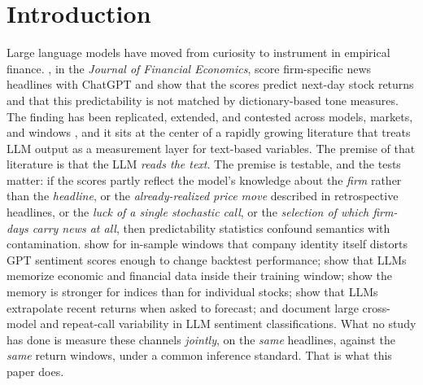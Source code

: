 \section{Introduction}\label{sec:intro}

Large language models have moved from curiosity to instrument in empirical finance. \citet{lopezlira2026}, in the \emph{Journal of Financial Economics}, score firm-specific news headlines with ChatGPT and show that the scores predict next-day stock returns and that this predictability is not matched by dictionary-based tone measures. The finding has been replicated, extended, and contested across models, markets, and windows \citep{nie2024survey}, and it sits at the center of a rapidly growing literature that treats LLM output as a measurement layer for text-based variables. The premise of that literature is that the LLM \emph{reads the text}. The premise is testable, and the tests matter: if the scores partly reflect the model's knowledge about the \emph{firm} rather than the \emph{headline}, or the \emph{already-realized price move} described in retrospective headlines, or the \emph{luck of a single stochastic call}, or the \emph{selection of which firm-days carry news at all}, then predictability statistics confound semantics with contamination. \citet{glasserman2023} show for in-sample windows that company identity itself distorts GPT sentiment scores enough to change backtest performance; \citet{lopezlira2025} show that LLMs memorize economic and financial data inside their training window; \citet{didisheim2025} show the memory is stronger for indices than for individual stocks; \citet{chen2025} show that LLMs extrapolate recent returns when asked to forecast; and \citet{herrera2025} document large cross-model and repeat-call variability in LLM sentiment classifications. What no study has done is measure these channels \emph{jointly}, on the \emph{same} headlines, against the \emph{same} return windows, under a common inference standard. That is what this paper does.

